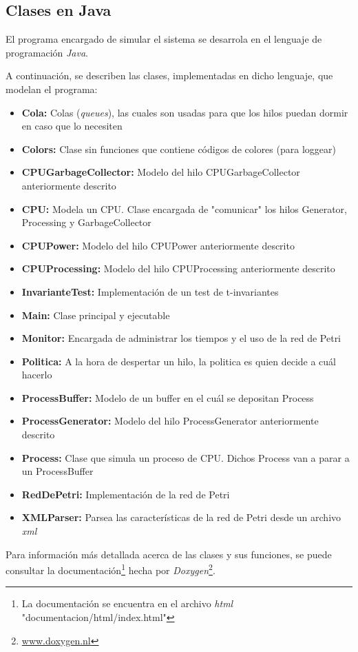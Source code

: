 \documentclass{article}
\newcommand{\fndoc}{La documentación se encuentra en el archivo \emph{html} "documentacion/html/index.html"}
\newcommand{\fndoxy}{\url{www.doxygen.nl}}
\begin{document}
    \subsection{Clases en Java}
    El programa encargado de simular el sistema se desarrola en el lenguaje de programación
    \emph{Java}. \par
    A continuación, se describen las clases, implementadas en dicho lenguaje,
    que modelan el programa:
    \begin{itemize}
        \item \textbf{Cola:} Colas (\emph{queues}), las cuales son usadas para que los
        hilos puedan dormir en caso que lo necesiten
        \item \textbf{Colors:} Clase sin funciones que contiene códigos de colores (para 
        loggear)
        \item \textbf{CPUGarbageCollector:} Modelo del hilo CPUGarbageCollector anteriormente
        descrito
        \item \textbf{CPU:} Modela un CPU. Clase encargada de "comunicar" los hilos Generator,
        Processing y GarbageCollector
        \item \textbf{CPUPower:} Modelo del hilo CPUPower anteriormente descrito
        \item \textbf{CPUProcessing:} Modelo del hilo CPUProcessing anteriormente descrito
        \item \textbf{InvarianteTest:} Implementación de un test de t-invariantes
        \item \textbf{Main:} Clase principal y ejecutable
        \item \textbf{Monitor:} Encargada de administrar los tiempos y el uso de la red de 
        Petri
        \item \textbf{Politica:} A la hora de despertar un hilo, la politica es quien decide
        a cuál hacerlo
        \item \textbf{ProcessBuffer:} Modelo de un buffer en el cuál se depositan Process
        \item \textbf{ProcessGenerator:} Modelo del hilo ProcessGenerator anteriormente
        descrito
        \item \textbf{Process:} Clase que simula un proceso de CPU. Dichos Process van a
        parar a un ProcessBuffer
        \item \textbf{RedDePetri:} Implementación de la red de Petri
        \item \textbf{XMLParser:} Parsea las características de la red de Petri desde un
        archivo \emph{xml}
    \end{itemize} \par
    Para información más detallada acerca de las clases y sus funciones, se puede consultar
    la documentación\footnote{\fndoc} hecha por \emph{Doxygen}\footnote{\fndoxy}.
\end{document}

